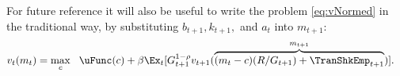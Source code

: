 For future reference it will also be useful to write the problem \eqref{eq:vNormed} in the traditional way, by substituting ${b}_{t+1},{k}_{t+1},$ and ${a}_{t}$ into ${m}_{t+1}$:
\begin{equation}\begin{gathered}\begin{aligned}
      v_{t}({m}_{t}) & = \max_{c} ~~ \uFunc(c)+ \beta \Ex_{t}[ G_{t+1}^{1-\rho}v_{t+1}(\overbrace{({m}_{t}-c)(R/G_{t+1})+\TranShkEmp_{t+1}}^{m_{t+1}})] \label{eq:vusual}.
    \end{aligned}\end{gathered}\end{equation}


